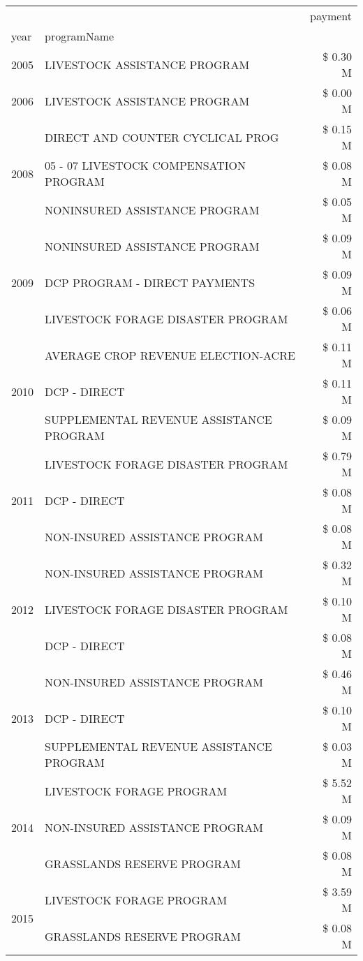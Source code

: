 \begin{tabular}{llr}
\toprule
 &  & payment \\
year & programName &  \\
\midrule
2005 & LIVESTOCK ASSISTANCE PROGRAM & \$ 0.30 M \\
\cline{1-3}
2006 & LIVESTOCK ASSISTANCE PROGRAM & \$ 0.00 M \\
\cline{1-3}
\multirow[t]{3}{*}{2008} & DIRECT AND COUNTER CYCLICAL PROG & \$ 0.15 M \\
 & 05 - 07 LIVESTOCK COMPENSATION PROGRAM & \$ 0.08 M \\
 & NONINSURED ASSISTANCE PROGRAM & \$ 0.05 M \\
\cline{1-3}
\multirow[t]{3}{*}{2009} & NONINSURED ASSISTANCE PROGRAM & \$ 0.09 M \\
 & DCP PROGRAM - DIRECT PAYMENTS & \$ 0.09 M \\
 & LIVESTOCK FORAGE DISASTER  PROGRAM & \$ 0.06 M \\
\cline{1-3}
\multirow[t]{3}{*}{2010} & AVERAGE CROP REVENUE ELECTION-ACRE & \$ 0.11 M \\
 & DCP - DIRECT & \$ 0.11 M \\
 & SUPPLEMENTAL REVENUE ASSISTANCE PROGRAM & \$ 0.09 M \\
\cline{1-3}
\multirow[t]{3}{*}{2011} & LIVESTOCK FORAGE DISASTER PROGRAM & \$ 0.79 M \\
 & DCP - DIRECT & \$ 0.08 M \\
 & NON-INSURED ASSISTANCE PROGRAM & \$ 0.08 M \\
\cline{1-3}
\multirow[t]{3}{*}{2012} & NON-INSURED ASSISTANCE PROGRAM & \$ 0.32 M \\
 & LIVESTOCK FORAGE DISASTER PROGRAM & \$ 0.10 M \\
 & DCP - DIRECT & \$ 0.08 M \\
\cline{1-3}
\multirow[t]{3}{*}{2013} & NON-INSURED ASSISTANCE PROGRAM & \$ 0.46 M \\
 & DCP - DIRECT & \$ 0.10 M \\
 & SUPPLEMENTAL REVENUE ASSISTANCE PROGRAM & \$ 0.03 M \\
\cline{1-3}
\multirow[t]{3}{*}{2014} & LIVESTOCK FORAGE PROGRAM & \$ 5.52 M \\
 & NON-INSURED ASSISTANCE PROGRAM & \$ 0.09 M \\
 & GRASSLANDS RESERVE PROGRAM & \$ 0.08 M \\
\cline{1-3}
\multirow[t]{3}{*}{2015} & LIVESTOCK FORAGE PROGRAM & \$ 3.59 M \\
 & GRASSLANDS RESERVE PROGRAM & \$ 0.08 M \\

\end{tabular}

